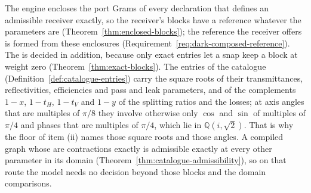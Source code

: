 
The engine encloses the port Grams of every declaration that defines an
admissible receiver exactly, so the receiver's blocks have a reference
whatever the parameters are (Theorem~\ref{thm:enclosed-blocks}); the
reference the receiver offers is formed from these enclosures
(Requirement~\ref{req:dark-composed-reference}). The 
is decided in addition, because only exact entries let a snap keep a
block at weight zero (Theorem~\ref{thm:exact-blocks}). The entries of the
catalogue (Definition~\ref{def:catalogue-entries}) carry the square roots of
their transmittances, reflectivities, efficiencies and pass and leak
parameters, and of the complements $1-x$, $1-t_H$, $1-t_V$ and $1-y$ of the
splitting ratios and the losses; at axis angles that are multiples of
$\pi/8$ they involve otherwise only $\cos$ and $\sin$ of multiples of
$\pi/4$ and phases that are multiples of $\pi/4$, which lie in
$\mathbb{Q}(i,\sqrt2)$. That is why the floor of item (ii) names those square
roots and those angles. A compiled graph whose  are contractions exactly is admissible exactly at every other
parameter in its domain (Theorem~\ref{thm:catalogue-admissibility}), so on
that route the model needs no decision beyond those blocks and the domain
comparisons.

